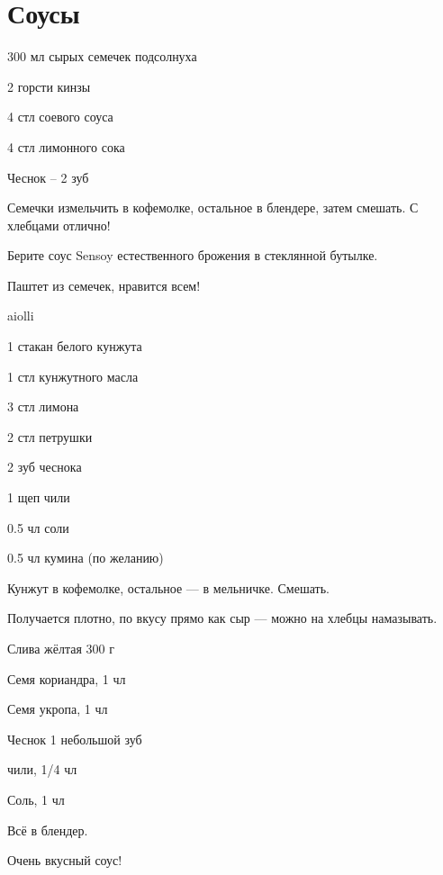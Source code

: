 \chapter*{Соусы}
\label{sec:sauces}


{\label{aiolli}
\item 300 мл сырых семечек подсолнуха
\item 2 горсти кинзы 
\item 4 стл соевого соуса
\item 4 стл лимонного сока
}{
\item Чеснок – 2 зуб
}{
Семечки измельчить в кофемолке, остальное в блендере, затем смешать. С хлебцами отлично!
}{
\begin{advice}
\item Берите соус Sensoy естественного брожения в стеклянной бутылке.
\item Паштет из семечек, нравится всем!
\end{advice}}{aiolli}



{\label{takini}
\item 1 стакан белого кунжута 
\item 1 стл кунжутного масла
\item 3 стл лимона
\item 2 стл петрушки
}{
\item 2 зуб чеснока
\item 1 щеп чили
\item 0.5 чл соли
\item 0.5 чл кумина (по желанию)
}{
Кунжут в кофемолке, остальное — в мельничке. Смешать. 
}{
\begin{advice}
\item Получается плотно, по вкусу прямо как сыр — можно на хлебцы намазывать.
\end{advice}}{}



{
\item Слива жёлтая 300 г
}{
\item Семя кориандра, 1 чл
\item Семя укропа, 1 чл
\item Чеснок 1 небольшой зуб
\item чили, 1/4 чл
\item Соль, 1 чл
}{
Всё в блендер.  
}{
\begin{advice}
\item Очень вкусный соус! 
\end{advice}}{}



